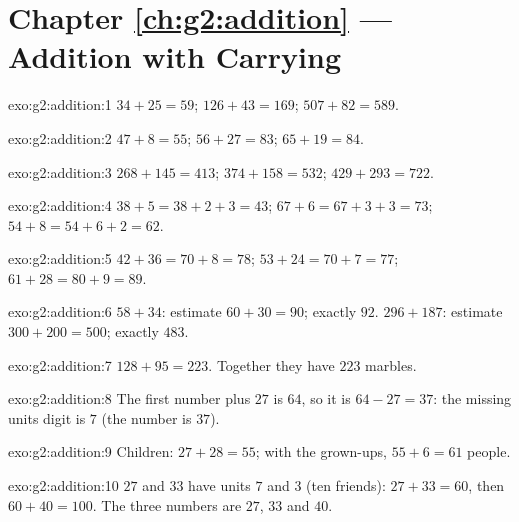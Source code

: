 \section*{Chapter \ref{ch:g2:addition} --- Addition with Carrying}

\begin{solution}{exo:g2:addition:1}
$34 + 25 = 59$; \quad $126 + 43 = 169$; \quad $507 + 82 = 589$.
\end{solution}

\begin{solution}{exo:g2:addition:2}
$47 + 8 = 55$; \quad $56 + 27 = 83$; \quad $65 + 19 = 84$.
\end{solution}

\begin{solution}{exo:g2:addition:3}
$268 + 145 = 413$; \quad $374 + 158 = 532$; \quad
$429 + 293 = 722$.
\end{solution}

\begin{solution}{exo:g2:addition:4}
$38 + 5 = 38 + 2 + 3 = 43$; \quad $67 + 6 = 67 + 3 + 3 = 73$; \quad
$54 + 8 = 54 + 6 + 2 = 62$.
\end{solution}

\begin{solution}{exo:g2:addition:5}
$42 + 36 = 70 + 8 = 78$; \quad $53 + 24 = 70 + 7 = 77$; \quad
$61 + 28 = 80 + 9 = 89$.
\end{solution}

\begin{solution}{exo:g2:addition:6}
$58 + 34$: estimate $60 + 30 = 90$; exactly $92$.
$296 + 187$: estimate $300 + 200 = 500$; exactly $483$.
\end{solution}

\begin{solution}{exo:g2:addition:7}
$128 + 95 = 223$. Together they have $223$ marbles.
\end{solution}

\begin{solution}{exo:g2:addition:8}
The first number plus $27$ is $64$, so it is $64 - 27 = 37$: the
missing units digit is $7$ (the number is $37$).
\end{solution}

\begin{solution}{exo:g2:addition:9}
Children: $27 + 28 = 55$; with the grown-ups, $55 + 6 = 61$
people.
\end{solution}

\begin{solution}{exo:g2:addition:10}
$27$ and $33$ have units $7$ and $3$ (ten friends):
$27 + 33 = 60$, then $60 + 40 = 100$. The three numbers are
$27$, $33$ and $40$.
\end{solution}
